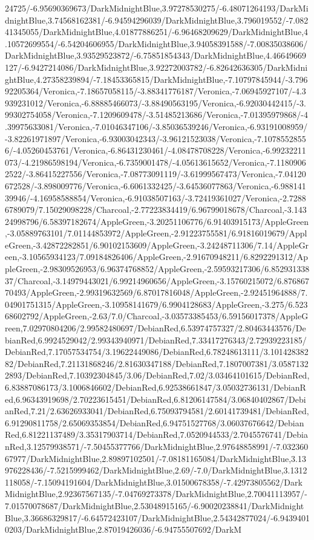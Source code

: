 {\begin{tikzternal}
24725/-6.95690369673/DarkMidnightBlue,3.97278530275/-6.48071264193/DarkMidnightBlue,3.74568162381/-6.94594296039/DarkMidnightBlue,3.796019552/-7.08241345055/DarkMidnightBlue,4.01877886251/-6.96468209629/DarkMidnightBlue,4.10572699554/-6.54204606955/DarkMidnightBlue,3.94058391588/-7.00835038606/DarkMidnightBlue,3.93529523872/-6.75851854343/DarkMidnightBlue,4.46649669127/-6.9427214086/DarkMidnightBlue,3.92272003782/-6.82642636305/DarkMidnightBlue,4.27358239894/-7.18453365815/DarkMidnightBlue,-7.10797845944/-3.79692205364/Veronica,-7.18657058115/-3.88341776187/Veronica,-7.06945927107/-4.3939231012/Veronica,-6.88885466073/-3.88490563195/Veronica,-6.92030442415/-3.99302754058/Veronica,-7.1209609478/-3.51485213686/Veronica,-7.01395979868/-4.39975633081/Veronica,-7.01046347106/-3.85036539246/Veronica,-6.93191008959/-3.82261971897/Veronica,-6.93003042343/-3.96121523038/Veronica,-7.10785528556/-4.05260453761/Veronica,-6.86431230461/-4.08478708228/Veronica,-6.99232211073/-4.21986598194/Veronica,-6.7359001478/-4.05613615652/Veronica,-7.11809062522/-3.86415227556/Veronica,-7.08773091119/-3.61999567473/Veronica,-7.04120672528/-3.898009776/Veronica,-6.6061332425/-3.64536077863/Veronica,-6.98814139946/-4.16958588854/Veronica,-6.91038507163/-3.72419361027/Veronica,-2.72886789079/7.15029098228/Charcoal,-2.77223834419/6.96799018678/Charcoal,-3.14324998796/6.58397182674/AppleGreen,-3.20251106776/6.91403915173/AppleGreen,-3.05889763101/7.01144853972/AppleGreen,-2.91223755581/6.91816019679/AppleGreen,-3.42872282851/6.90102153609/AppleGreen,-3.24248711306/7.14/AppleGreen,-3.10565934123/7.09184826406/AppleGreen,-2.91670948211/6.8292291312/AppleGreen,-2.98309526953/6.96374768852/AppleGreen,-2.59593217306/6.85293133837/Charcoal,-3.14979443021/6.99214960656/AppleGreen,-3.15760215072/6.87686770493/AppleGreen,-2.99319632569/6.87017816048/AppleGreen,-2.92451964888/7.04901751315/AppleGreen,-3.10958141679/6.9904128683/AppleGreen,-3.275/6.52368602792/AppleGreen,-2.63/7.0/Charcoal,-3.03573385453/6.59156017378/AppleGreen,7.02970804206/2.99582480697/DebianRed,6.53974757327/2.80463443576/DebianRed,6.9924529042/2.99343940971/DebianRed,7.33417276343/2.72939223185/DebianRed,7.17057534754/3.19622449086/DebianRed,6.78248613111/3.10142838282/DebianRed,7.21131868246/2.81630347188/DebianRed,7.1807007381/3.05871322893/DebianRed,7.10392304845/3.06/DebianRed,7.02/3.03464101615/DebianRed,6.83887086173/3.1006846602/DebianRed,6.92538661847/3.05032736131/DebianRed,6.96343919698/2.70223615451/DebianRed,6.81206147584/3.06840402867/DebianRed,7.21/2.63626933041/DebianRed,6.75093794581/2.60141739481/DebianRed,6.91290811758/2.65069353854/DebianRed,6.94751527768/3.06037676642/DebianRed,6.81221137489/3.35317903714/DebianRed,7.0520944533/2.7045576741/DebianRed,3.12579938571/-7.50455377766/DarkMidnightBlue,2.97648858991/-7.03236067977/DarkMidnightBlue,2.89897102501/-7.08181165084/DarkMidnightBlue,3.13976228436/-7.5215999462/DarkMidnightBlue,2.69/-7.0/DarkMidnightBlue,3.1312118058/-7.15094191604/DarkMidnightBlue,3.01500678358/-7.42973805562/DarkMidnightBlue,2.92367567135/-7.04769273378/DarkMidnightBlue,2.70041113957/-7.01570078687/DarkMidnightBlue,2.53048915165/-6.90020238841/DarkMidnightBlue,3.36686329817/-6.64572423107/DarkMidnightBlue,2.54342877024/-6.94394010203/DarkMidnightBlue,2.87019426036/-6.94755507692/DarkM
\end{tikzternal}}
